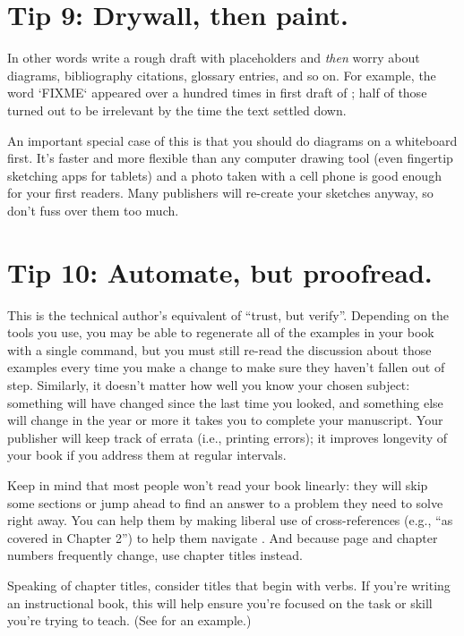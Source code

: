\documentclass[10pt,letterpaper]{article}
\begin{document}
\section*{Tip 9: Drywall, then paint.}

In other words write a rough draft with placeholders
and \emph{then} worry about diagrams, bibliography citations, glossary entries, and so on.
For example,
the word `FIXME` appeared over a hundred times in first draft of \cite{Wi2019};
half of those turned out to be irrelevant by the time the text settled down.

An important special case of this is that you should do diagrams on a whiteboard first.
It's faster and more flexible than any computer drawing tool
(even fingertip sketching apps for tablets)
and a photo taken with a cell phone is good enough for your first readers.
Many publishers will re-create your sketches anyway,
so don't fuss over them too much.

\section*{Tip 10: Automate, but proofread.}

This is the technical author's equivalent of ``trust, but verify''.
Depending on the tools you use,
you may be able to regenerate all of the examples in your book with a single command,
but you must still re-read the discussion about those examples every time you make a change
to make sure they haven't fallen out of step.
Similarly,
it doesn't matter how well you know your chosen subject:
something will have changed since the last time you looked,
and something else will change in the year or more it takes you to complete your manuscript.
Your publisher will keep track of errata (i.e., printing errors);
it improves longevity of your book if you address them at regular intervals.

Keep in mind that most people won't read your book linearly:
they will skip some sections or jump ahead to find an answer to a problem they need to solve right away.
You can help them by making liberal use of cross-references
(e.g., ``as covered in Chapter 2'') to help them navigate \cite{Li2020}.
And because page and chapter numbers frequently change, use chapter titles instead.

Speaking of chapter titles, consider titles that begin with verbs.
If you're writing an instructional book,
this will help ensure you're focused on the task or skill you're trying to teach.
(See \cite{Me2022} for an example.)
\end{document}
